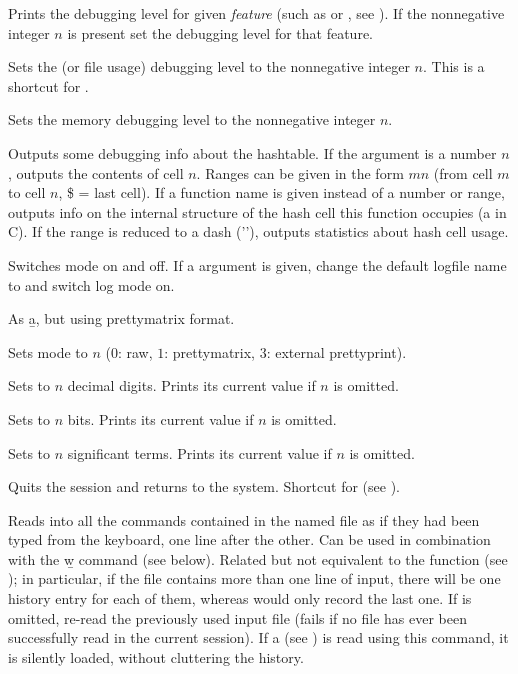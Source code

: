  Prints the debugging level for given
\emph{feature} (such as  or , see ).
If the nonnegative integer $n$ is present set the debugging level for
that feature.

 Sets the  (or file usage) debugging level
to the nonnegative integer $n$. This is a shortcut
for .

 Sets the memory debugging level 
to the nonnegative integer $n$.

 Outputs some debugging info about the
hashtable. If the argument is a number $n$, outputs the contents of cell
$n$. Ranges can be given in the form $m$\kbd{-}$n$ (from cell $m$ to cell
$n$, \$ = last cell). If a function name is given instead of a number or
range, outputs info on the internal structure of the hash cell this
function occupies (a  in C). If the range is reduced to
a dash ('\kbd{-}'), outputs statistics about hash cell usage.

 Switches  mode on and off.
If a  argument is given, change the default logfile name to
 and switch log mode on.

 As \b{a}, but using prettymatrix format.

 Sets  mode to $n$ ($0$: raw, $1$:
prettymatrix, $3$: external prettyprint).

 Sets  to $n$ decimal digits.
Prints its current value if $n$ is omitted.

 Sets  to $n$ bits.
Prints its current value if $n$ is omitted.

 Sets  to $n$ significant terms.
Prints its current value if $n$ is omitted.

 Quits the  session and returns to the system.
Shortcut for \kbd{()} (see ).

 Reads into  all the
commands contained in the named file as if they had been typed from the
keyboard, one line after the other. Can be used in combination with the \b{w}
command (see below). Related but not equivalent to the function 
(see ); in particular, if the file contains more than one
line of input, there will be one history entry for each of them, whereas
 would only record the last one. If  is omitted,
re-read the previously used input file (fails if no file has ever been
successfully read in the current session). If a  
(see ) is read using this command, it is silently loaded,
without cluttering the history.

